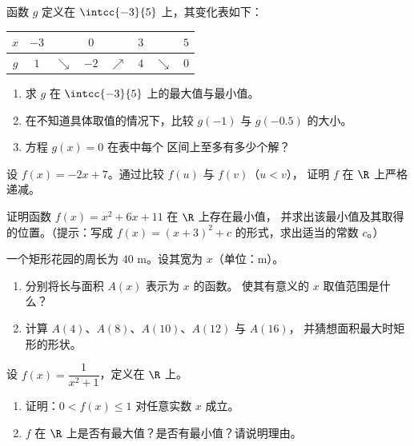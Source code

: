 \begin{exercise}[$\star$]\label{exo:g10:functions:5}
函数 $g$ 定义在 $\intcc{-3}{5}$ 上，其变化表如下：
\begin{center}
\renewcommand{\arraystretch}{1.3}
\begin{tabular}{c|ccccccc}
$x$ & $-3$ & & $0$ & & $3$ & & $5$ \\
\hline
$g$ & $1$ & $\searrow$ & $-2$ & $\nearrow$ & $4$ & $\searrow$ & $0$ \\
\end{tabular}
\end{center}
\begin{enumerate}
  \item 求 $g$ 在 $\intcc{-3}{5}$ 上的最大值与最小值。
  \item 在不知道具体取值的情况下，比较 $g(-1)$ 与 $g(-0.5)$ 的大小。
  \item 方程 $g(x) = 0$ 在表中每个
        区间上至多有多少个解？
\end{enumerate}
\end{exercise}

\begin{exercise}[$\star\star$]\label{exo:g10:functions:6}
设 $f(x) = -2x + 7$。通过比较 $f(u)$ 与 $f(v)$（$u < v$），
证明 $f$ 在 $\R$ 上严格递减。
\end{exercise}

\begin{exercise}[$\star\star$]\label{exo:g10:functions:7}
证明函数 $f(x) = x^2 + 6x + 11$ 在 $\R$ 上存在最小值，
并求出该最小值及其取得的位置。（提示：写成
$f(x) = (x + 3)^2 + c$ 的形式，求出适当的常数 $c$。）
\end{exercise}

\begin{exercise}[$\star\star$]\label{exo:g10:functions:8}
一个矩形花园的周长为 $40$ m。设其宽为
$x$（单位：m）。
\begin{enumerate}
  \item 分别将长与面积 $A(x)$ 表示为 $x$ 的函数。
        使其有意义的 $x$ 取值范围是什么？
  \item 计算 $A(4)$、$A(8)$、$A(10)$、$A(12)$ 与 $A(16)$，
        并猜想面积最大时矩形的形状。
\end{enumerate}
\end{exercise}

\begin{exercise}[$\star\star$]\label{exo:g10:functions:9}
设 $f(x) = \dfrac{1}{x^2 + 1}$，定义在 $\R$ 上。
\begin{enumerate}
  \item 证明：$0 < f(x) \leq 1$ 对任意实数 $x$ 成立。
  \item $f$ 在 $\R$ 上是否有最大值？是否有最小值？请说明理由。
\end{enumerate}
\end{exercise}

